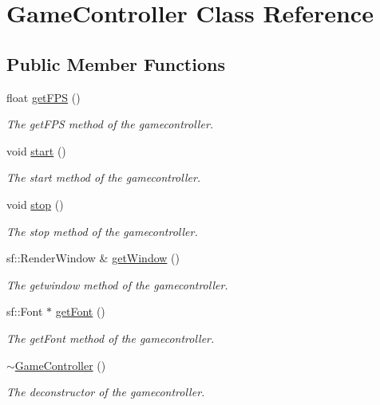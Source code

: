 \hypertarget{class_game_controller}{\section{Game\+Controller Class Reference}
\label{class_game_controller}
}
\subsection*{Public Member Functions}
\begin{DoxyCompactItemize}
\item 
float \hyperlink{class_game_controller_a54e8117f438fa872e5c1b24fd9469816}{get\+F\+P\+S} ()
\begin{DoxyCompactList}\small\item\em The get\+F\+P\+S method of the gamecontroller. \end{DoxyCompactList}\item 
void \hyperlink{class_game_controller_af365cd7a71dd76730a0bc92adc092103}{start} ()
\begin{DoxyCompactList}\small\item\em The start method of the gamecontroller. \end{DoxyCompactList}\item 
void \hyperlink{class_game_controller_a97872acdc39172c21e06665854656994}{stop} ()
\begin{DoxyCompactList}\small\item\em The stop method of the gamecontroller. \end{DoxyCompactList}\item 
sf\+::\+Render\+Window \& \hyperlink{class_game_controller_a993ad55478fff868c801ee7e6f4aaa2b}{get\+Window} ()
\begin{DoxyCompactList}\small\item\em The getwindow method of the gamecontroller. \end{DoxyCompactList}\item 
sf\+::\+Font $\ast$ \hyperlink{class_game_controller_a305a4e04f9d2e6232a8a63fe1c6d317e}{get\+Font} ()
\begin{DoxyCompactList}\small\item\em The get\+Font method of the gamecontroller. \end{DoxyCompactList}\item 
\hypertarget{class_game_controller_aab436961a422d078975bc7a49bdfcab7}{\hyperlink{class_game_controller_aab436961a422d078975bc7a49bdfcab7}{$\sim$\+Game\+Controller} ()}\label{class_game_controller_aab436961a422d078975bc7a49bdfcab7}

\begin{DoxyCompactList}\small\item\em The deconstructor of the gamecontroller. \end{DoxyCompactList}\end{DoxyCompactItemize}
